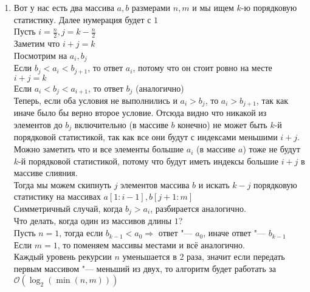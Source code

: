 \documentclass[a4paper, 10pt]{article}
\begin{document}
\begin{enumerate}
    \item{
        Вот у нас есть два массива $a, b$ размерами $n, m$ и мы ищем $k$-ю порядковую статистику. Далее нумерация будет с $1$\\
        Пусть $i = \frac{n}{2}, j = k - \frac{n}{2}$\\
        Заметим что $i + j = k$\\
        Посмотрим на $a_i, b_j$\\
        Если $b_j < a_i < b_{j + 1}$, то ответ $a_i$, потому что он стоит ровно на месте $i + j = k$\\
        Если $a_i < b_j < a_{i + 1}$, то ответ $b_j$ (аналогично)\\
        Теперь, если оба условия не выполнились и $a_i > b_j$, то $a_i > b_{j + 1}$, так как иначе было бы верно второе условие. Отсюда видно что никакой из элементов до $b_j$ включительно (в массиве $b$ конечно) не может быть $k$-й порядковой статистикой, так как все они будут с индексами меньшими $i + j$. Можно заметить что и все элементы большие $a_i$ (в массиве $a$) тоже не будут $k$-й порядковой статистикой, потому что будут иметь индексы большие $i + j$ в массиве слияния.\\
        Тогда мы можем скипнуть $j$ элементов массива $b$ и искать $k - j$ порядковую статистику на массивах $a[1 : i - 1], b[j + 1 : m]$\\
        Симметричный случай, когда $b_j > a_i$, разбирается аналогично.\\
        Что делать, когда один из массивов длины $1$?\\
        Пусть $n = 1$, тогда если $b_{k - 1} < a_0 \Rightarrow$ ответ "--- $a_0$, иначе ответ "--- $b_{k - 1}$\\
        Если $m = 1$, то поменяем массивы местами и всё аналогично.\\
        Каждый уровень рекурсии $n$ уменьшается в $2$ раза, значит если передать первым массивом "--- меньший из двух, то алгоритм будет работать за $\mathcal{O}(\log_2(\min(n, m)))$
    }

\end{enumerate}
\end{document}
